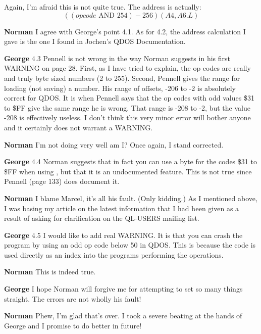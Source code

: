 Again, I'm afraid this is not quite true. The address is
    actually: $$((op code \text{ AND } 254) - 256)(A4,A6.L)$$

{\bf Norman} 
I agree with George's point 4.1.
    As for 4.2, the address calculation I gave is the one I found in Jochen's
    QDOS Documentation.



{\bf George} 
4.3 Pennell is not wrong in the
    way Norman suggests in his first WARNING on page 28. First, as I have
    tried to explain, the op codes are really and truly byte sized numbers (2
    to 255). Second, Pennell gives the range for loading (not saving) a
    number. His range of offsets, -{}206 to -{}2 is absolutely correct for QDOS.
    It is when Pennell says that the op codes with odd values \$31 to \$FF give
    the same range he is wrong. That range is -{}208 to -{}2, but the value -{}208
    is effectively useless. I don't think this very minor error will bother
    anyone and it certainly does not warrant a WARNING.



{\bf Norman} 
I'm not doing very well am I? Once again, I stand corrected.



{\bf George} 
4.4 Norman suggests that in fact
    you can use a byte for the codes \$31 to \$FF when using , but that
    it is an undocumented feature. This is not true since Pennell (page 133)
    does document it.



{\bf Norman} 
I blame Marcel, it's all his
    fault. (Only kidding.) As I mentioned above, I was basing my article on
    the latest information that I had been given as a result of asking for
    clarification on the QL-{}USERS mailing list.



{\bf George} 
4.5 I would like to add real
    WARNING. It is that you can crash the program by using an odd op code
    below 50 in QDOS. This is because the code is used directly as an index
    into the programs performing the operations.



{\bf Norman} 
This is indeed true.



{\bf George} 
I hope Norman will forgive me
    for attempting to set so many things straight. The errors are not wholly
    his fault!



{\bf Norman} 
Phew, I'm glad that's over. I
    took a severe beating at the hands of George and I promise to do better in
    future!



